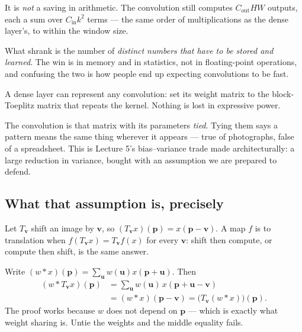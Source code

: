\documentclass[11pt,a4paper]{article}
\begin{document}
\begin{failbox}[title={What the saving is not}]
It is \emph{not} a saving in arithmetic. The convolution still computes
$C_{\text{out}}HW$ outputs, each a sum over $C_{\text{in}}k^2$ terms --- the
same order of multiplications as the dense layer's, to within the window size.

What shrank is the number of \emph{distinct numbers that have to be stored and
learned}. The win is in memory and in statistics, not in floating-point
operations, and confusing the two is how people end up expecting convolutions
to be fast.
\end{failbox}

\begin{keybox}[title={Weight sharing is a constraint, not a trick}]
A dense layer can represent any convolution: set its weight matrix to the
block-Toeplitz matrix that repeats the kernel. Nothing is lost in expressive
power.

The convolution is that matrix with its parameters \emph{tied}. Tying them says
a pattern means the same thing wherever it appears --- true of photographs,
false of a spreadsheet. This is Lecture 5's bias--variance trade made
architecturally: a large reduction in variance, bought with an assumption we
are prepared to defend.
\end{keybox}

\subsection{What that assumption is, precisely}

Let $T_{\mathbf{v}}$ shift an image by $\mathbf{v}$, so
$(T_{\mathbf{v}}x)(\mathbf{p}) = x(\mathbf{p} - \mathbf{v})$. A map $f$ is
 to translation when
$f(T_{\mathbf{v}}x) = T_{\mathbf{v}}f(x)$ for every $\mathbf{v}$: shift then
compute, or compute then shift, is the same answer.

\begin{derivbox}[title={Convolution is equivariant --- one change of variable}]
Write $(w * x)(\mathbf{p}) = \sum_{\mathbf{u}} w(\mathbf{u})
x(\mathbf{p}+\mathbf{u})$. Then
\[
\begin{aligned}
(w * T_{\mathbf{v}}x)(\mathbf{p})
 &= \sum_{\mathbf{u}} w(\mathbf{u})\,x(\mathbf{p}+\mathbf{u}-\mathbf{v}) \\
 &= (w * x)(\mathbf{p}-\mathbf{v})
  = \bigl(T_{\mathbf{v}}(w * x)\bigr)(\mathbf{p}).
\end{aligned}
\]
The proof works because $w$ does not depend on $\mathbf{p}$ --- which is
exactly what weight sharing is. Untie the weights and the middle equality
fails.
\end{derivbox}
\end{document}
